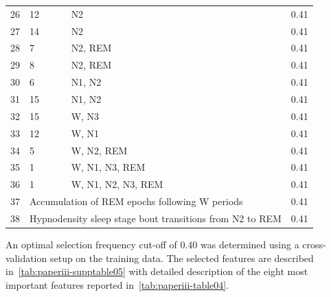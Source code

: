 \begin{table}
\begin{tabular}{@{}lp{6cm}lr@{}}
        26 & 12                                                     & \ac{N2}                               & 0.41                         \\
        27 & 14                                                     & \ac{N2}                               & 0.41                         \\
        28 & 7                                                      & \ac{N2}, \ac{REM}                     & 0.41                         \\
        29 & 8                                                      & \ac{N2}, \ac{REM}                     & 0.41                         \\
        30 & 6                                                      & \ac{N1}, \ac{N2}                      & 0.41                         \\
        31 & 15                                                     & \ac{N1}, \ac{N2}                      & 0.41                         \\
        32 & 15                                                     & \ac{W}, \ac{N3}                       & 0.41                         \\
        33 & 12                                                     & \ac{W}, \ac{N1}                       & 0.41                         \\
        34 & 5                                                      & \ac{W}, \ac{N2}, \ac{REM}             & 0.41                         \\
        35 & 1                                                      & \ac{W}, \ac{N1}, \ac{N3}, \ac{REM}    & 0.41                         \\
        36 & 1                                                      & \ac{W}, \ac{N1}, \ac{N2}, \ac{N3}, \ac{REM}   & 0.41                 \\
        37 & \multicolumn{2}{l}{Accumulation of \ac{REM} epochs following \ac{W} periods}                   & 0.41                         \\
        38 & \multicolumn{2}{l}{Hypnodensity sleep stage bout transitions from \ac{N2} to \ac{REM}}         & 0.41                         \\ \bottomrule
    \end{tabular}
\end{table}

An optimal selection frequency cut-off of 0.40 was determined using a cross-validation setup on the training data. 
The selected features are described in~\cref{tab:paperiii-supptable05} with detailed description of the eight most important features reported in~\cref{tab:paperiii-table04}.

